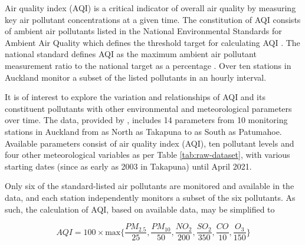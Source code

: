 \documentclass{aucklandthesis}
\begin{document}
Air quality index (AQI) is a critical indicator of overall air quality by measuring key air pollutant concentrations at a given time. The constitution of AQI consists of ambient air pollutants listed in the National Environmental Standards for Ambient Air Quality which defines the threshold target for calculating AQI \autocite{aqi}. The national standard defines AQI as the maximum ambient air pollutant measurement ratio to the national target as a percentage \autocite{aqitarget}. Over ten stations in Auckland monitor a subset of the listed pollutants in an hourly interval.

It is of interest to explore the variation and relationships of AQI and its constituent pollutants with other environmental and meteorological parameters over time. The data, provided by \textcite{aklenvdata}, includes 14 parameters from 10 monitoring stations in Auckland from as North as Takapuna to as South as Patumahoe. Available parameters consist of air quality index (AQI), ten pollutant levels and four other meteorological variables as per Table \ref{tab:raw-dataset}, with various starting dates (since as early as 2003 in Takapuna) until April 2021.

Only six of the standard-listed air pollutants are monitored and available in the data, and each station independently monitors a subset of the six pollutants. As such, the calculation of AQI, based on available data, may be simplified to

\begin{equation}\label{eq:aqicon} AQI = 100 \times \textrm{max}\{\frac{PM_{2.5}}{25}, \frac{PM_{10}}{50}, \frac{NO_{2}}{200}, \frac{SO_{2}}{350}, \frac{CO}{10}, \frac{O_{3}}{150}\} \end{equation}
\end{document}

